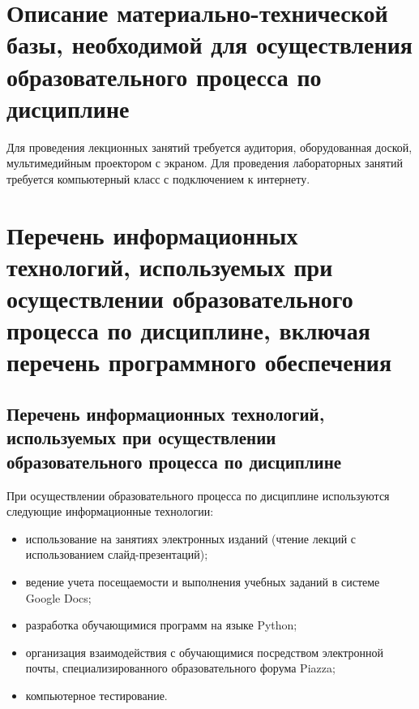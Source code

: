\documentclass[a4paper,12pt]{article}
\begin{document}
\newpage
\section{Описание материально-технической базы, необходимой для осуществления образовательного процесса по дисциплине}
  
  
       Для проведения лекционных занятий требуется аудитория, оборудованная доской,  мультимедийным проектором с экраном. 
       Для проведения лабораторных занятий требуется компьютерный класс с подключением к интернету.
  
  


\section{Перечень информационных технологий, используемых при осуществлении образовательного процесса по дисциплине, включая перечень программного обеспечения
}

\subsection{Перечень информационных технологий, используемых при осуществлении образовательного процесса по дисциплине}

При осуществлении образовательного процесса по дисциплине используются следующие информационные технологии:
\begin{itemize}[nolistsep]
  
\item использование на занятиях электронных изданий (чтение лекций с использованием слайд-презентаций);
  
\item ведение учета посещаемости и выполнения учебных заданий в системе Google Docs;
  
\item разработка обучающимися программ на языке Python;
  
\item организация взаимодействия с обучающимися посредством электронной почты, специализированного образовательного форума Piazza;
  
\item компьютерное тестирование.
  
\end{itemize}
\end{document}
